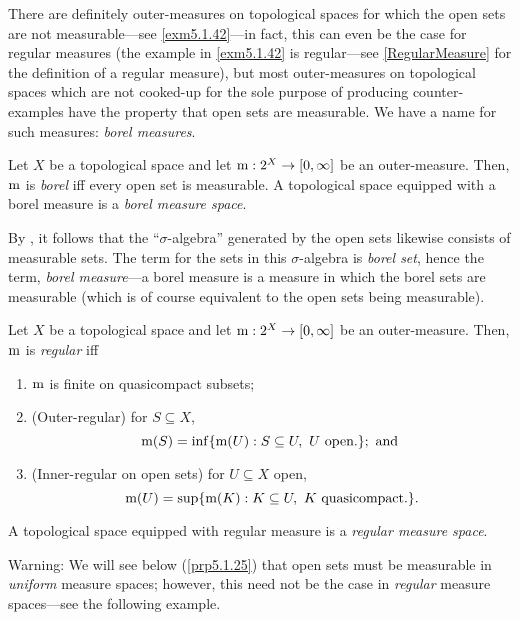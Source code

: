 There are definitely outer-measures on topological spaces for which the open sets are not measurable---see \cref{exm5.1.42}---in fact, this can even be the case for regular measures (the example in \cref{exm5.1.42} is regular---see \cref{RegularMeasure} for the definition of a regular measure), but most outer-measures on topological spaces which are not cooked-up for the sole purpose of producing counter-examples have the property that open sets are measurable.  We have a name for such measures:  \emph{borel measures}.
\begin{dfn}\label{BorelMeasure}
Let $X$ be a topological space and let $\mathrm{m} :2^X\rightarrow [0,\infty ]$ be an outer-measure.  Then, $\mathrm{m}$ is \emph{borel} iff every open set is measurable.  A topological space equipped with a borel measure is a \emph{borel measure space}.
\begin{rmk}
By , it follows that the ``$\sigma$-algebra'' generated by the open sets likewise consists of measurable sets.  The term for the sets in this $\sigma$-algebra is \emph{borel set}, hence the term, \emph{borel measure}---a borel measure is a measure in which the borel sets are measurable (which is of course equivalent to the open sets being measurable).
\end{rmk}
\end{dfn}
\begin{dfn}\label{RegularMeasure}
Let $X$ be a topological space and let $\mathrm{m} :2^X\rightarrow [0,\infty ]$ be an outer-measure.  Then, $\mathrm{m}$ is \emph{regular} iff
\begin{enumerate}
\item $\mathrm{m}$ is finite on quasicompact subsets;
\item (Outer-regular) for $S\subseteq X$,
\begin{equation}
\meas (S)=\inf \{ \meas (U):S\subseteq U,\ U\text{ open.}\} ;\text{ and }
\end{equation}
\item (Inner-regular on open sets) for $U\subseteq X$ open,
\begin{equation}
\mathrm{m} (U)=\sup \{ \mathrm{m} (K):K\subseteq U,\ K\text{ quasicompact.}\} .
\end{equation}
\end{enumerate}
A topological space equipped with regular measure is a \emph{regular measure space}.
\begin{rmk}
Warning:  We will see below (\cref{prp5.1.25}) that open sets must be measurable in \emph{uniform} measure spaces; however, this need not be the case in \emph{regular} measure spaces---see the following example.
\end{rmk}
\end{dfn}
